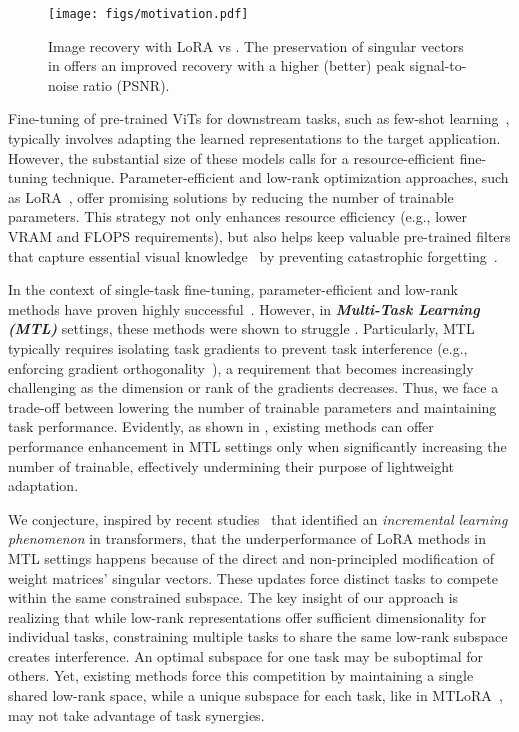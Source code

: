 \begin{figure}[t]
    \centering
\texttt{[image: figs/motivation.pdf]}
    \caption{Image recovery with LoRA vs \ourmethod. The preservation of singular vectors in \ourmethod{} offers an improved recovery with a higher (better) peak signal-to-noise ratio (PSNR).}
    \label{fig:motivation}
\end{figure}
Fine-tuning of pre-trained ViTs for downstream tasks, such as few-shot learning~\citep{Hu_2022_CVPR,Park_2024_CVPR}, typically involves adapting the learned representations to the target application. However, the substantial size of these models calls for a resource-efficient fine-tuning technique. Parameter-efficient and low-rank optimization approaches, such as LoRA~\citep{hu2022lora}, offer promising solutions by reducing the number of trainable parameters. This strategy not only enhances resource efficiency (e.g., lower VRAM and FLOPS requirements), 
but also helps keep valuable pre-trained filters that capture essential visual knowledge~\citep{burns2023makespretrainedvisualrepresentations} by preventing catastrophic forgetting~\citep{luo2023investigatingforgettingpretrainedrepresentations, he2023preservingpretrainedfeatureshelps}.

In the context of single-task fine-tuning, parameter-efficient and low-rank methods have proven highly successful~\citep{hu2022lora, houlsby2019parameterefficienttransferlearningnlp, mahabadi2021parameter, karimi2021compacter}.
However, in {\textit{\textbf{Multi-Task Learning (MTL)}}} settings, these methods were shown to struggle \cite{ agiza2024mtlora}. Particularly, MTL typically requires isolating task gradients to prevent task interference (e.g., enforcing gradient orthogonality~\citep{pcgrad,NIPS1995_bdb106a0}), a requirement that becomes increasingly challenging as the dimension or rank of the gradients decreases.
Thus, we face a trade-off between lowering the number of trainable parameters and maintaining task performance. Evidently, as shown in  
, existing methods can offer performance enhancement in MTL settings only when significantly increasing the number of trainable, effectively undermining their purpose of lightweight adaptation. 

We conjecture, inspired by recent studies~\citep{NEURIPS2023_4d69c1c0} that identified an \textit{incremental learning phenomenon} in transformers, that the underperformance of LoRA methods in MTL settings happens because of the direct and non-principled modification of weight matrices' singular vectors. These updates force distinct tasks to compete within the same constrained subspace. The key insight of our approach is realizing that while low-rank representations offer sufficient dimensionality for individual tasks, constraining multiple tasks to share the same low-rank subspace creates interference. An optimal subspace for one task may be suboptimal for others. Yet, existing methods force this competition by maintaining a single shared low-rank space, while a unique subspace for each task, like in MTLoRA~\citep{agiza2024mtlora}, may not take advantage of task synergies.

